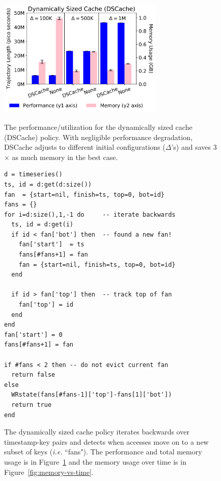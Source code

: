 \begin{figure}[tb]
  \centering
  \includegraphics[width=0.7\textwidth]{./chapters/controlplane/parsplice/figures/dscache-vs-none.png}\\
  \caption{The performance/utilization for the dynamically sized cache
  (DSCache) policy. With negligible performance degradation, DSCache adjusts to
  different initial configurations (\(\Delta\)'s) and saves 3\(\times\) as much
  memory in the best case.}
  \label{fig:dscache-vs-none}
\end{figure}

\begin{figure}[tb]
\footnotesize
\ssp
\begin{verbatim}
d = timeseries()
ts, id = d:get(d:size())
fan  = {start=nil, finish=ts, top=0, bot=id}
fans = {}
for i=d:size(),1,-1 do     -- iterate backwards
  ts, id = d:get(i)
  if id < fan['bot'] then  -- found a new fan!
    fan['start']  = ts
    fans[#fans+1] = fan 
    fan = {start=nil, finish=ts, top=0, bot=id}
  end 

  if id > fan['top'] then  -- track top of fan
    fan['top'] = id 
  end 
end
fan['start'] = 0 
fans[#fans+1] = fan 

if #fans < 2 then -- do not evict current fan
  return false
else
  WRstate(fans[#fans-1]['top']-fans[1]['bot']) 
  return true
end
\end{verbatim}
\dsp
\caption{The dynamically sized cache policy iterates backwards over
timestamp-key pairs and detects when accesses move on to a new subset of keys
({\it i.e.} ``fans"). The performance and total memory usage is in
Figure~\ref{fig:dscache-vs-none} and the memory usage over time is in
Figure~\ref{fig:memory-vs-time}.
\label{src:dyn-cache}}
\end{figure}

